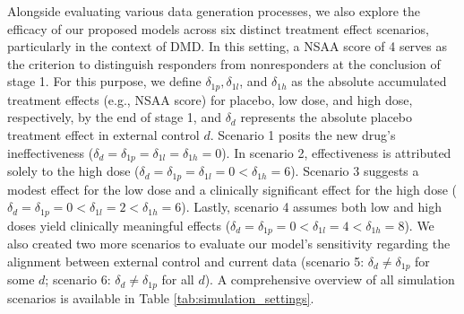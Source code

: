 Alongside evaluating various data generation processes, we also explore the efficacy of our proposed models across six distinct treatment effect scenarios, particularly in the context of \ac{DMD}. In this setting, a \ac{NSAA} score of 4 serves as the criterion to distinguish responders from nonresponders at the conclusion of stage 1. For this purpose, we define \(\delta_{1p}, \delta_{1l}\), and \(\delta_{1h}\) as the absolute accumulated treatment effects (e.g., \ac{NSAA} score) for placebo, low dose, and high dose, respectively, by the end of stage 1, and \(\delta_{d}\) represents the absolute placebo treatment effect in external control \(d\). Scenario 1 posits the new drug's ineffectiveness (\(\delta_{d} = \delta_{1p} = \delta_{1l} = \delta_{1h} = 0\)). In scenario 2, effectiveness is attributed solely to the high dose (\(\delta_{d} = \delta_{1p} = \delta_{1l} = 0 < \delta_{1h} = 6\)). Scenario 3 suggests a modest effect for the low dose and a clinically significant effect for the high dose (\(\delta_{d} = \delta_{1p} = 0 < \delta_{1l} = 2 < \delta_{1h} = 6\)). Lastly, scenario 4 assumes both low and high doses yield clinically meaningful effects (\(\delta_{d} = \delta_{1p} = 0 < \delta_{1l} = 4 < \delta_{1h} = 8\)). We also created two more scenarios to evaluate our model's sensitivity regarding the alignment between external control and current data (scenario 5: \(\delta_d \ne \delta_{1p}\) for some \(d\); scenario 6: \(\delta_d \ne \delta_{1p}\) for all \(d\)). A comprehensive overview of all simulation scenarios is available in Table \ref{tab:simulation_settings}.


